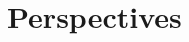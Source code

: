 \documentclass[10pt,usepdftitle=false]{beamer}
\begin{document}




\section{Perspectives}
\end{document}
